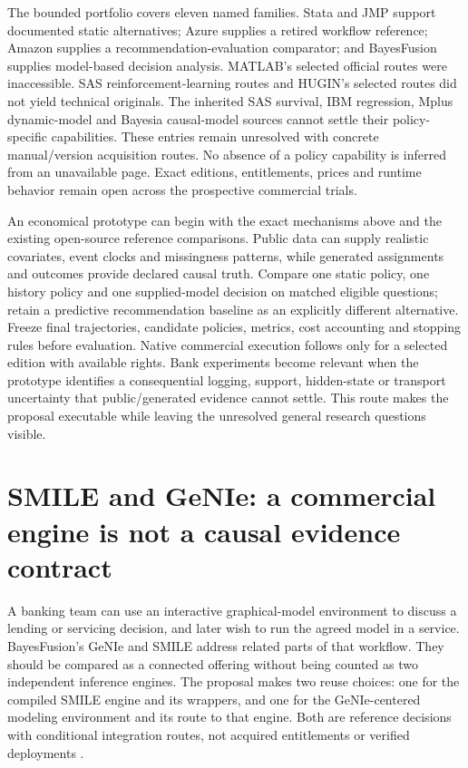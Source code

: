 The bounded portfolio covers eleven named families. Stata and JMP support
documented static alternatives; Azure supplies a retired workflow reference;
Amazon supplies a recommendation-evaluation comparator; and BayesFusion
supplies model-based decision analysis. MATLAB's selected official routes were
inaccessible. SAS reinforcement-learning routes and HUGIN's selected routes
did not yield technical originals. The inherited SAS survival, IBM regression,
Mplus dynamic-model and Bayesia causal-model sources cannot settle their
policy-specific capabilities. These entries remain unresolved with concrete
manual/version acquisition routes. No absence of a policy capability is
inferred from an unavailable page. Exact editions, entitlements, prices and
runtime behavior remain open across the prospective commercial trials.
\citep{exec16_cp_matrix}

An economical prototype can begin with the exact mechanisms above and the
existing open-source reference comparisons. Public data can supply realistic
covariates, event clocks and missingness patterns, while generated assignments
and outcomes provide declared causal truth. Compare one static policy,
one history policy and one supplied-model decision on matched eligible
questions; retain a predictive recommendation baseline as an explicitly
different alternative. Freeze final trajectories, candidate policies, metrics,
cost accounting and stopping rules before evaluation. Native commercial
execution follows only for a selected edition with available rights. Bank
experiments become relevant when the prototype identifies a consequential
logging, support, hidden-state or transport uncertainty that public/generated
evidence cannot settle. This route makes the proposal executable while leaving
the unresolved general research questions visible. \citep{exec16_cp_matrix}
\label{exec16:commercial-policy-end}


\section{SMILE and GeNIe: a commercial engine is not a causal evidence contract}
\label{sec:exec24-smile-reuse}

A banking team can use an interactive graphical-model environment to discuss
a lending or servicing decision, and later wish to run the agreed model in
a service. BayesFusion's GeNIe and SMILE address related parts of that
workflow. They should be compared as a connected offering without being
counted as two independent inference engines. The proposal makes two reuse
choices: one for the compiled SMILE engine and its wrappers, and one for the
GeNIe-centered modeling environment and its route to that engine. Both are
reference decisions with conditional integration routes, not acquired
entitlements or verified deployments \cite{exec13_smile_intro,
exec13_smile_license,exec24_smile_choice}.

